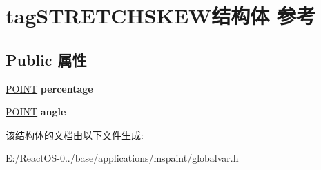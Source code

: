 \hypertarget{structtag_s_t_r_e_t_c_h_s_k_e_w}{}\section{tag\+S\+T\+R\+E\+T\+C\+H\+S\+K\+E\+W结构体 参考}
\label{structtag_s_t_r_e_t_c_h_s_k_e_w}
\subsection*{Public 属性}
\begin{DoxyCompactItemize}
\item 
\mbox{\label{structtag_s_t_r_e_t_c_h_s_k_e_w_a121ab5946e36709e63efcceaea0f8dac}} 
\hyperlink{structtag_p_o_i_n_t}{P\+O\+I\+NT} {\bfseries percentage}
\item 
\mbox{\label{structtag_s_t_r_e_t_c_h_s_k_e_w_af1fb5e94165be4141fa32eed4b669bd6}} 
\hyperlink{structtag_p_o_i_n_t}{P\+O\+I\+NT} {\bfseries angle}
\end{DoxyCompactItemize}


该结构体的文档由以下文件生成\+:\begin{DoxyCompactItemize}
\item 
E\+:/\+React\+O\+S-\/0../base/applications/mspaint/globalvar.\+h\end{DoxyCompactItemize}
